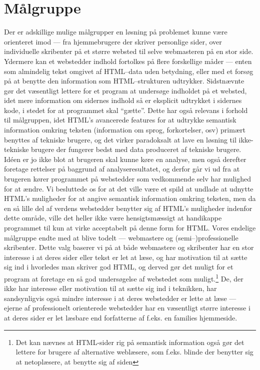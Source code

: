 \documentclass[a4paper,oneside]{memoir}
\begin{document}
\section{Målgruppe}
\label{målgruppe}
Der er adskillige mulige målgrupper en løsning på problemet kunne være
orienteret imod --- fra hjemmebrugere der skriver personlige sider,
over individuelle skribenter på et større websted til selve
webmasteren på en stor side. Ydermere kan et webstedder indhold
fortolkes på flere forskellige måder --- enten som almindelig tekst
omgivet af HTML--data uden betydning, eller med et forsøg på at
benytte den information som HTML--strukturen udtrykker. Sidstnævnte
gør det væsentligt lettere for et program at undersøge indholdet på et
websted, idet mere information om sidernes indhold så er eksplicit
udtrykket i sidernes kode, i stedet for at programmet skal
``gætte''. Dette har også relevans i forhold til målgruppen, idet
HTML's avancerede features for at udtrykke semantisk information
omkring teksten (information om sprog, forkortelser, osv) primært
benyttes af tekniske brugere, og det virker paradoksalt at lave en
løsning til ikke-tekniske brugere der fungerer bedst med data
produceret af tekniske brugere. Idéen er jo ikke blot at brugeren skal
kunne køre en analyse, men også derefter foretage rettelser på
baggrund af analyseresultatet, og derfor går vi ud fra at brugeren
kører programmet på webstedder som vedkommende selv har mulighed for at
ændre. Vi besluttede os for at det ville være et spild at undlade at
udnytte HTML's muligheder for at angive semantisk information omkring
teksten, men da en så lille del af verdens webstedder benytter sig af
HTML's muligheder indenfor dette område, ville det heller ikke være
hensigtsmæssigt at handikappe programmet til kun at virke acceptabelt
på denne form for HTML. Vores endelige målgruppe endte med at blive
todelt --- webmastere og (semi--)professionelle skribenter. Dette valg
baserer vi på at både webmastere og skribenter har en stor interesse i
at deres sider eller tekst er let at læse, og har motivation til at
sætte sig ind i hvorledes man skriver god HTML, og derved gør det
muligt for et program at foretage en så god undersøgelse af webstedet
som muligt.\footnote{Det kan nævnes at HTML-sider rig på semantisk
  information også gør det lettere for brugere af alternative
  weblæsere, som f.eks. blinde der benytter sig at netoplæsere, at
  benytte sig af siden} De, der ikke har interesse eller motivation
til at sætte sig ind i teknikken, har sandsynligvis også mindre
interesse i at deres webstedder er lette at læse --- ejerne af
professionelt orienterede webstedder har en væsentligt større interesse
i at deres sider er let læsbare end forfatterne af f.eks. en families
hjemmeside.
\end{document}
